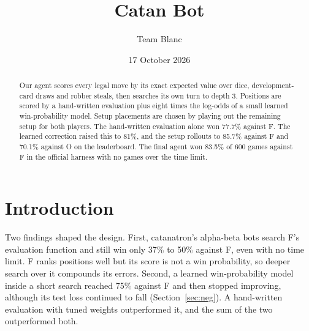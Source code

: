 \documentclass[11pt,a4paper]{article}
\title{\vspace{-1.4cm}Catan Bot}
\author{Team Blanc}
\date{17 October 2026}
\begin{document}
\maketitle\vspace{-0.9cm}

\begin{abstract}\noindent
Our agent scores every legal move by its exact expected value over dice, development-card draws and robber steals,
then searches its own turn to depth 3. Positions are scored by a hand-written evaluation plus eight times the
log-odds of a small learned win-probability model. Setup placements are chosen by playing out the remaining setup
for both players. The hand-written evaluation alone won 77.7\% against F. The learned correction raised this to 81\%,
and the setup rollouts to 85.7\% against F and 70.1\% against O on the leaderboard. The final agent won 83.5\% of 600
games against F in the official harness with no games over the time limit.
\end{abstract}

\section{Introduction}
Two findings shaped the design. First, catanatron's alpha-beta bots search F's evaluation function and still win
only 37\% to 50\% against F, even with no time limit. F ranks positions well but its score is not a win probability,
so deeper search over it compounds its errors. Second, a learned win-probability model inside a short search
reached 75\% against F and then stopped improving, although its test loss continued to fall (Section~\ref{sec:neg}).
A hand-written evaluation with tuned weights outperformed it, and the sum of the two outperformed both.
\end{document}
